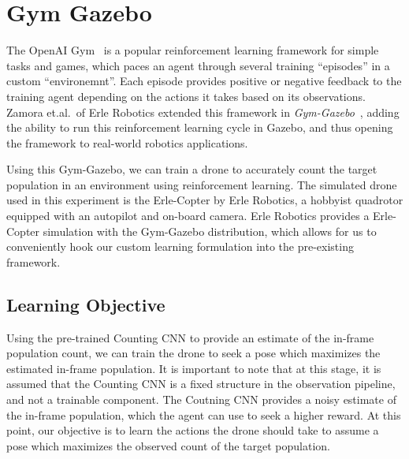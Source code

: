 \documentclass[10pt,twocolumn,letterpaper]{article}
\begin{document}

\section{Gym Gazebo}

  The OpenAI Gym~\cite{openaigym} is a popular reinforcement learning framework
  for simple tasks and games, which paces an agent through several training
  ``episodes'' in a custom ``environemnt''. Each episode provides positive or
  negative feedback to the training agent depending on the actions it takes
  based on its observations. Zamora et.al.\ of Erle Robotics extended this
  framework in \textit{Gym-Gazebo}~\cite{GymGazebo}, adding the ability to run
  this reinforcement learning cycle in Gazebo, and thus opening the framework
  to real-world robotics applications.

  Using this Gym-Gazebo, we can train a drone to accurately count the target
  population in an environment using reinforcement learning. The simulated
  drone used in this experiment is the Erle-Copter by Erle Robotics, a hobbyist
  quadrotor equipped with an autopilot and on-board camera. Erle Robotics
  provides a Erle-Copter simulation with the Gym-Gazebo distribution, which
  allows for us to conveniently hook our custom learning formulation into the
  pre-existing framework.


\subsection{Learning Objective}
  
  Using the pre-trained Counting CNN to provide an estimate of the in-frame
  population count, we can train the drone to seek a pose which maximizes the
  estimated in-frame population. It is important to note that at this stage, it
  is assumed that the Counting CNN is a fixed structure in the observation
  pipeline, and not a trainable component. The Coutning CNN provides a noisy
  estimate of the in-frame population, which the agent can use to seek a higher
  reward. At this point, our objective is to learn the actions the drone should
  take to assume a pose which maximizes the observed count of the target
  population.
\end{document}
